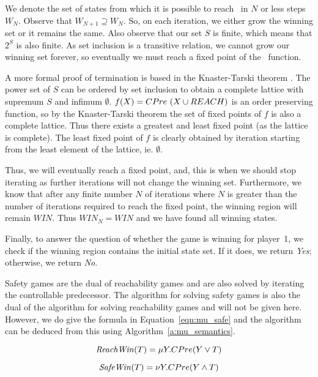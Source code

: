 We denote the set of states from which it is possible to reach \reach\ in $N$ or less steps $W_N$. Observe that $W_{N+1} \supseteq W_N$. So, on each iteration, we either grow the winning set or it remains the same. Also observe that our set $S$ is finite, which means that $2^S$ is also finite. As set inclusion is a transitive relation, we cannot grow our winning set forever, so eventually we must reach a fixed point of the \cpre\ function. 

A more formal proof of termination is based in the Knaster-Tarski theorem \cite{tarski1955}. The power set of $S$ can be ordered by set inclusion to obtain a complete lattice with supremum $S$ and infimum $\emptyset$. $f(X) = CPre\ (X \cup REACH)$ is an order preserving function, so by the Knaster-Tarski theorem the set of fixed points of $f$ is also a complete lattice. Thus there exists a greatest and least fixed point (as the lattice is complete). The least fixed point of $f$ is clearly obtained by iteration starting from the least element of the lattice, ie. $\emptyset$. 

Thus, we will eventually reach a fixed point, and, this is when we should stop iterating as further iterations will not change the winning set. Furthermore, we know that after any finite number $N$ of iterations where $N$ is greater than the number of iterations required to reach the fixed point, the winning region will remain $WIN$. Thus $WIN_N = WIN$ and we have found all winning states.

Finally, to answer the question of whether the game is winning for player~1, we check if the winning region contains the initial state set. If it does, we return \emph{Yes}; otherwise, we return \emph{No}.

Safety games are the dual of reachability games and are also solved by iterating the controllable predecessor. The algorithm for solving safety games is also the dual of the algorithm for solving reachability games and will not be given here. However, we do give the \mucalc formula in Equation~\ref{eqn:mu_safe} and the algorithm can be deduced from this using Algorithm~\ref{a:mu_semantics}.

\begin{equation}
    \mathit{ReachWin}(T) = \mu Y. CPre(Y \vee T)
\label{eqn:mu_reach}
\end{equation}

\begin{equation}
\mathit{SafeWin}(T) = \nu Y. CPre(Y \wedge T)
\label{eqn:mu_safe}
\end{equation}

